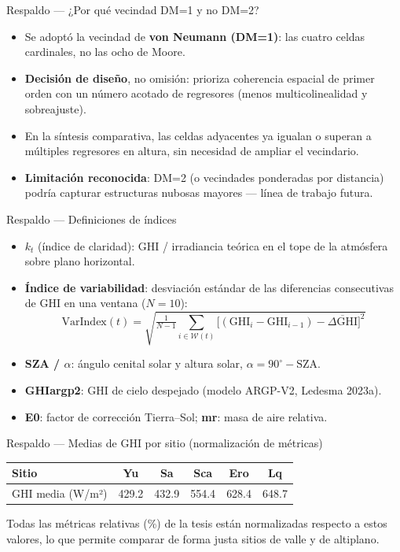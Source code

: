 \documentclass[aspectratio=169,11pt]{beamer}
\begin{document}
\begin{frame}{Respaldo — ¿Por qué vecindad DM=1 y no DM=2?}
  \footnotesize
  \begin{itemize}
    \item Se adoptó la vecindad de \textbf{von Neumann (DM=1)}: las cuatro celdas cardinales, no las ocho de Moore.
    \item \textbf{Decisión de diseño}, no omisión: prioriza coherencia espacial de primer orden con un número acotado de regresores (menos multicolinealidad y sobreajuste).
    \item En la síntesis comparativa, las celdas adyacentes ya igualan o superan a múltiples regresores en altura, sin necesidad de ampliar el vecindario.
    \item \textbf{Limitación reconocida}: DM=2 (o vecindades ponderadas por distancia) podría capturar estructuras nubosas mayores — línea de trabajo futura.
  \end{itemize}
\end{frame}

\begin{frame}{Respaldo — Definiciones de índices}
  \scriptsize
  \begin{itemize}
    \item \textbf{$k_t$} (índice de claridad): GHI / irradiancia teórica en el tope de la atmósfera sobre plano horizontal.
    \item \textbf{Índice de variabilidad}: desviación estándar de las diferencias consecutivas de GHI en una ventana ($N=10$):
      \[ \mathrm{VarIndex}(t)=\sqrt{\tfrac{1}{N-1}\textstyle\sum_{i\in\mathcal{W}(t)}\big[(\mathrm{GHI}_i-\mathrm{GHI}_{i-1})-\overline{\Delta\mathrm{GHI}}\big]^2} \]
    \item \textbf{SZA / $\alpha$}: ángulo cenital solar y altura solar, $\alpha=90^\circ-\mathrm{SZA}$.
    \item \textbf{GHIargp2}: GHI de cielo despejado (modelo ARGP-V2, Ledesma 2023a).
    \item \textbf{E0}: factor de corrección Tierra–Sol; \textbf{mr}: masa de aire relativa.
  \end{itemize}
\end{frame}

\begin{frame}{Respaldo — Medias de GHI por sitio (normalización de métricas)}
  \scriptsize
  \centering
  \renewcommand{\arraystretch}{1.3}
  \begin{tabular}{@{}lccccc@{}}
    \toprule
    Sitio & Yu & Sa & Sca & Ero & Lq\\
    \midrule
    GHI media (W/m²) & 429.2 & 432.9 & 554.4 & 628.4 & 648.7\\
    \bottomrule
  \end{tabular}
  \vspace{0.8em}
  \par Todas las métricas relativas (\%) de la tesis están normalizadas respecto a estos valores, lo que permite comparar de forma justa sitios de valle y de altiplano.
\end{frame}
\end{document}
